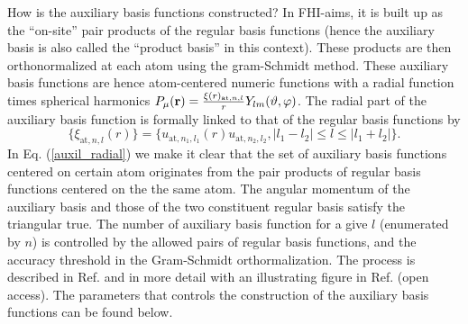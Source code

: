 How is the auxiliary basis functions constructed? In FHI-aims, it is  built 
up as the ``on-site'' pair products of the regular basis functions (hence
the auxiliary basis is also called the ``product basis'' in this context). 
These products are then orthonormalized at each atom using the gram-Schmidt 
method. These auxiliary basis functions are hence atom-centered numeric 
functions with a radial function times spherical harmonics 
 $P_{\mu}({\bf r}) = \frac{\xi(r)_{\text{at},n,l}}{r}Y_{lm}(\vartheta,\varphi)$. 
The radial part of the auxiliary basis function is 
formally linked to that of the regular basis functions by
  \begin{equation}
    \{\xi_{\text{at},n,l}(r)\} = \{u_{\text{at},n_1,l_1}(r)u_{\text{at},n_2,l_2},
     |l_1-l_2| \le l \le |l_1+l_2|  \}.
   \label{auxil_radial}
  \end{equation}
In Eq. (\ref{auxil_radial}) we make it clear that the set of auxiliary
basis functions centered on certain atom  originates from the pair
products of regular basis functions  
centered on the the same atom. The angular momentum of the auxiliary basis
and those of the two constituent regular basis satisfy the triangular 
true. The number of auxiliary basis function for a give $l$ 
(enumerated by $n$) is
controlled by the allowed pairs of regular basis functions, and the accuracy 
threshold in the Gram-Schmidt orthormalization. The process is
described in Ref. \cite{Ren12a} and in more detail with an
illustrating figure in Ref. \cite{Ihrig2015} (open access). The
parameters that controls the construction of the auxiliary basis
functions can be found below. 

